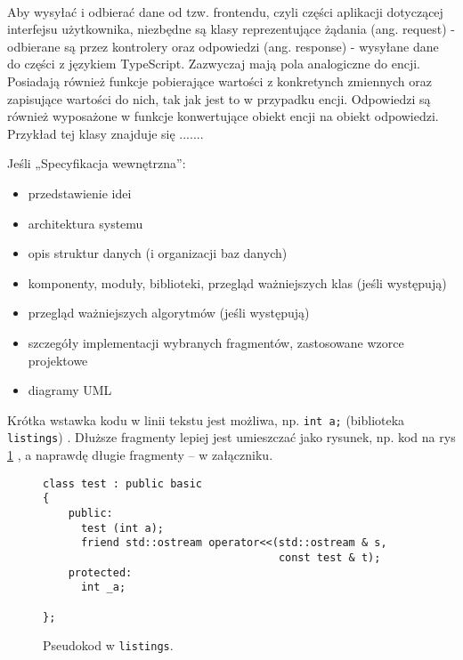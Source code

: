 \paragraph{}
Aby wysyłać i odbierać dane od tzw. frontendu, czyli części aplikacji dotyczącej interfejsu użytkownika, niezbędne są klasy reprezentujące żądania (ang. request) - odbierane są przez kontrolery oraz odpowiedzi (ang. response) - wysyłane dane do części z językiem TypeScript. Zazwyczaj mają pola analogiczne do encji. Posiadają również funkcje pobierające wartości z konkretynch zmiennych oraz zapisujące wartości do nich, tak jak jest to w przypadku encji. Odpowiedzi są również wyposażone w funkcje konwertujące obiekt encji na obiekt odpowiedzi. Przykład tej klasy znajduje się .......


Jeśli „Specyfikacja wewnętrzna”:
\begin{itemize}
\item przedstawienie idei
\item architektura systemu
\item opis struktur danych (i organizacji baz danych)
\item komponenty, moduły, biblioteki, przegląd ważniejszych klas (jeśli występują)
\item przegląd ważniejszych algorytmów (jeśli występują)
\item szczegóły implementacji wybranych fragmentów, zastosowane wzorce projektowe
\item diagramy UML
\end{itemize}



Krótka wstawka kodu w linii tekstu jest możliwa, np.  \lstinline|int a;| (biblioteka \texttt{listings})%
. 
Dłuższe fragmenty lepiej jest umieszczać jako rysunek, np. kod na rys \ref{fig:pseudokod:listings}%
, a naprawdę długie fragmenty – w załączniku.


\begin{figure}
\centering
\begin{lstlisting}
class test : public basic
{
    public:
      test (int a);
      friend std::ostream operator<<(std::ostream & s, 
                                     const test & t);
    protected:
      int _a;  
      
};
\end{lstlisting}
\caption{Pseudokod w \texttt{listings}.}
\label{fig:pseudokod:listings}
\end{figure}

